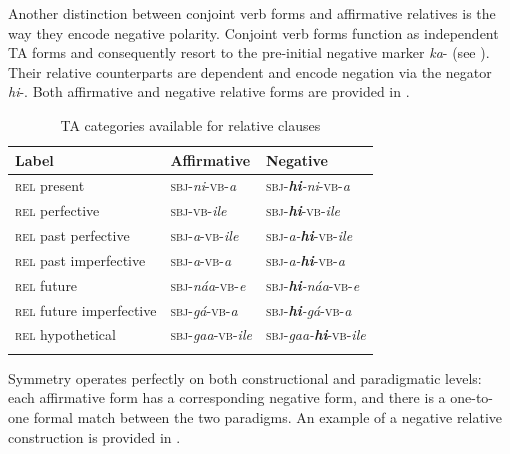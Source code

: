 \documentclass[output=paper,colorlinks=true, citecolor=brown,draftmode]{langscibook}
\begin{document}
Another distinction between conjoint verb forms and affirmative relatives is the way they encode negative polarity. Conjoint verb forms function as independent TA forms and consequently resort to the pre-initial negative marker \textit{ka}{}- (see ). Their relative counterparts are dependent and encode negation via the negator \textit{hi}{}-. Both affirmative and negative relative forms are provided in .

\begin{table}
\begin{tabularx}{\textwidth}{XXl}
\lsptoprule
{Label} & {Affirmative} & {Negative}\\
\midrule 
{\textsc{rel} present} & {\textsc{sbj}{}-\textit{ni}-\textsc{vb}{}-\textit{a}} & {\textsc{sbj}{}-\textit{\textbf{hi}{}-ni}-\textsc{vb}{}-\textit{a}}\\
{\textsc{rel} perfective} & {\textsc{sbj}{}-\textsc{vb}{}-\textit{ile}} & {\textsc{sbj}{}-\textit{\textbf{hi}}{}-\textsc{vb}{}-\textit{ile}}\\
{\textsc{rel} past perfective} & {\textsc{sbj}{}-\textit{a}-\textsc{vb}{}-\textit{ile}} & {\textsc{sbj}{}-\textit{a-\textbf{hi}}{}-\textsc{vb}{}-\textit{ile}}\\
{\textsc{rel} past imperfective} & {\textsc{sbj}{}-\textit{a}-\textsc{vb}{}-\textit{a}} & {\textsc{sbj}{}-\textit{a-\textbf{hi}}{}-\textsc{vb}{}-\textit{a}}\\
{\textsc{rel} future} & {\textsc{sbj}{}-\textit{náa}-\textsc{vb}{}-\textit{e}} & {\textsc{sbj}{}-\textit{\textbf{hi}{}-náa}-\textsc{vb}{}-\textit{e}}\\
{\textsc{rel} future imperfective} & {\textsc{sbj}{}-\textit{gá}-\textsc{vb}{}-\textit{a}} & {\textsc{sbj}{}-\textit{\textbf{hi}{}-gá}-\textsc{vb}{}-\textit{a}}\\
{\textsc{rel} hypothetical} & {\textsc{sbj}{}-\textit{gaa}-\textsc{vb}{}-\textit{ile}} & {\textsc{sbj}{}-\textit{gaa-\textbf{hi}}{}-\textsc{vb}{}-\textit{ile}}\\
\lspbottomrule
\end{tabularx}
\caption{TA categories available for relative clauses}
\label{tab:cuw:6}
\end{table}

Symmetry operates perfectly on both constructional and paradigmatic levels: each affirmative form has a corresponding negative form, and there is a one-to-one formal match between the two paradigms. An example of a negative relative construction is provided in .
\end{document}
